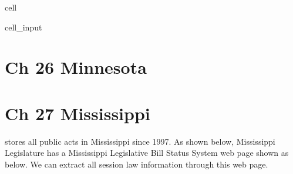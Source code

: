 \documentclass[letterpaper,10pt,english]{jupyterBook}
\begin{document}
\begin{sphinxuseclass}{cell}\begin{sphinxVerbatimInput}

\begin{sphinxuseclass}{cell_input}
\begin{sphinxVerbatim}[commandchars=\\\{\}]
  
     

  \PYG{p}{[}\PYG{p}{]}
                            

\end{sphinxVerbatim}

\end{sphinxuseclass}\end{sphinxVerbatimInput}

\end{sphinxuseclass}
\sphinxstepscope


\chapter{Ch 26 Minnesota}
\label{\detokenize{ch26:ch-26-minnesota}}\label{\detokenize{ch26::doc}}
\sphinxstepscope


\chapter{Ch 27 Mississippi}
\label{\detokenize{ch27:ch-27-mississippi}}\label{\detokenize{ch27::doc}}
\sphinxAtStartPar
{} stores all public acts in Mississippi since 1997. As shown below, Mississippi Legislature has a Mississippi Legislative Bill Status System web page shown as below. We can extract all session law information through this web page.
\end{document}
